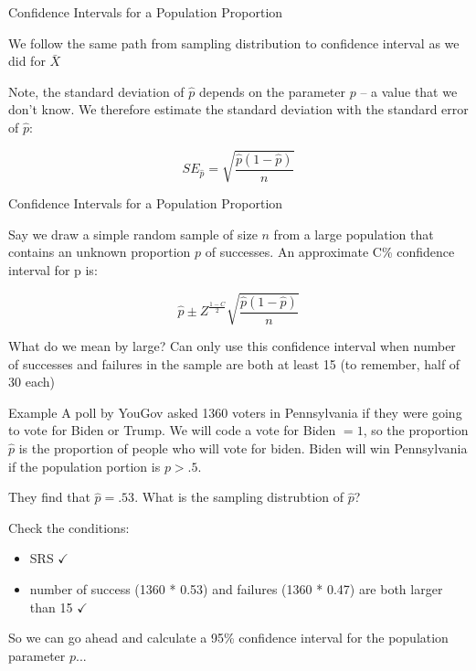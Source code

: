 \documentclass{beamer}
\begin{document}
\begin{frame}{Confidence Intervals for a Population Proportion}
	
	We follow the same path from sampling distribution to confidence interval as we did for $\bar{X}$
	
	Note, the standard deviation of $\hat{p}$ depends on the parameter $p$ -- a value that we don't know. We therefore estimate the standard deviation with the standard error of $\hat{p}$:

	\[ 
		SE_{\hat{p}}=\sqrt{\frac{\hat{p}(1-\hat{p})}{n}} 
	\]
	
\end{frame}

\begin{frame}{Confidence Intervals for a Population Proportion}
	
	Say we draw a simple random sample of size $n$ from a large population that contains an unknown proportion $p$ of successes. An approximate C\% \alert{confidence interval} for p is:
	
	\[ 
		\hat{p} \pm Z^\frac{1-C}{2} \sqrt{\frac{\hat{p}(1-\hat{p})}{n}} 
	\]
	
	What do we mean by large? Can only use this confidence interval when number of successes and failures in the sample are both at least 15 (to remember, half of 30 each)
	
\end{frame}

\begin{frame}{Example}
	A poll by YouGov asked 1360 voters in Pennsylvania if they were going to vote for Biden or Trump. We will code a vote for Biden $=1$, so the proportion $\hat{p}$ is the proportion of people who will vote for biden. Biden will win Pennsylvania if the population portion is $p > .5$. 

	They find that $\hat{p} = .53$. What is the sampling distrubtion of $\hat{p}$? 

	
	Check the conditions:
	\begin{itemize}
		\item SRS $\checkmark$
		\item number of success (1360 * 0.53) and failures (1360 * 0.47) are both larger than 15 $\checkmark$
	\end{itemize}

	So we can go ahead and calculate a 95\% confidence interval for the population parameter $p$... 
\end{frame}

\frame
\end{document}

